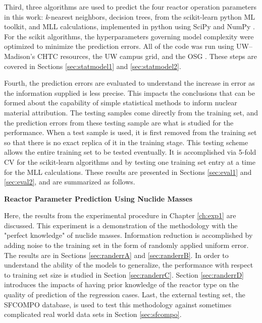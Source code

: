 Third, three algorithms are used to predict the four reactor operation
parameters in this work: \textit{k}-nearest neighbors, decision trees, from the
scikit-learn python \gls{ML} toolkit, and \gls{MLL} calculations, implemented
in python using SciPy and NumPy \cite{scikit, scipy, numpy}.  For the scikit
algorithms, the hyperparameters governing model complexity were optimized to
minimize the prediction errors.  All of the code was run using
\gls{UW}--Madison's \gls{CHTC} resources, the \gls{UW} campus grid, and the
\gls{OSG} \cite{osg07, osg09}.  These steps are covered in Sections
\ref{sec:statmodel1} and \ref{sec:statmodel2}.

Fourth, the prediction errors are evaluated to understand the increase in error
as the information supplied is less precise. This impacts the conclusions that
can be formed about the capability of simple statistical methods to inform
nuclear material attribution.  The testing samples come directly from the
training set, and the prediction errors from  these testing sample are what is
studied for the performance.  When a test sample is used, it is first removed
from the training set so that there is no exact replica of it in the training
stage.  This testing scheme allows the entire training set to be tested
eventually.  It is accomplished via 5-fold \gls{CV} for the scikit-learn
algorithms and by testing one training set entry at a time for the \gls{MLL}
calculations.  These results are presented in Sections \ref{sec:eval1} and
\ref{sec:eval2}, and are summarized as follows.

\noindent \textbf{Reactor Parameter Prediction Using Nuclide Masses}

Here, the results from the experimental procedure in Chapter \ref{ch:exp1} are
discussed.  This experiment is a demonstration of the methodology with the
"perfect knowledge" of nuclide masses. Information reduction is accomplished by
adding noise to the training set in the form of randomly applied uniform error.
The results are in Sections \ref{sec:randerrA} and \ref{sec:randerrB}.  In
order to understand the ability of the models to generalize, the performance
with respect to training set size is studied in Section \ref{sec:randerrC}.
Section \ref{sec:randerrD} introduces the impacts of having prior knowledge of
the reactor type on the quality of prediction of the regression cases.  Last,
the external testing set, the \gls{SFCOMPO} database, is used to test this
methodology against sometimes complicated real world data sets in Section
\ref{sec:sfcompo}. 

